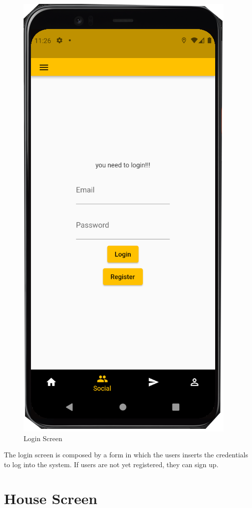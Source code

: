 \begin{figure}[H]
    \centering
    \includegraphics[scale = 0.4]{images/loginsignup.png}
    \caption{Login Screen}
\end{figure}
The login screen is composed by a form in which the users inserts the credentials to log into
the system. If users are not yet registered, they can sign up.\\

\section{House Screen}


